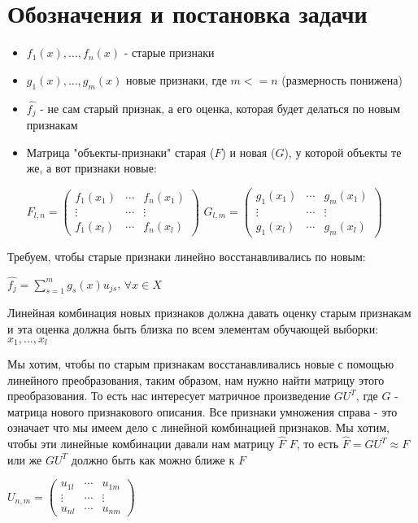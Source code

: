 \section{Обозначения и постановка задачи}

\begin{itemize}
    \item $f_{1}(x), \dotsc, f_{n}(x)$ - старые признаки
    \item $g_{1}(x), \dots ,g_{m}(x)$ новые признаки, где $m<=n$ (размерность понижена)
    \item $\hat{f_j}$ - не сам старый признак, а его оценка, которая будет делаться по новым признакам
    \item Матрица "объекты-признаки" старая ($F$) и новая ($G$), у которой объекты те же, а вот признаки новые: \par
        $F_{l,n} = 
         \begin{pmatrix}
          f_1(x_1) &  \cdots & f_n(x_1) \\
          \vdots   &  \cdots & \vdots   \\
          f_1(x_l) &  \cdots & f_n(x_l) 
         \end{pmatrix}$ 
        $G_{l,m} = 
         \begin{pmatrix}
          g_1(x_1) &  \cdots & g_m(x_1) \\
          \vdots   &  \cdots & \vdots   \\
          g_1(x_l) &  \cdots & g_m(x_l) 
         \end{pmatrix}$
\end{itemize}

Требуем, чтобы старые признаки линейно восстанавливались по новым:\par
$\hat{f_j} = \displaystyle\sum_{s=1}^{m} g_s(x)u_{js}$, $\forall x \in X$\par Линейная комбинация новых признаков должна давать оценку старым признакам и эта оценка должна быть близка по всем элементам обучающей выборки: $x_1, \dotsc, x_l$

Мы хотим, чтобы по старым признакам восстанавливались новые с помощью линейного преобразования, таким образом, нам нужно найти матрицу этого преобразования. То есть нас интересует матричное произведение $GU^T$, где $G$ - матрица нового признакового описания. Все признаки умножения справа - это означает что мы имеем дело с линейной комбинацией признаков. Мы хотим, чтобы эти линейные комбинации давали нам матрицу $\hat{F}$ \approx $F$, то есть $\hat{F} = GU^T \approx F$ или же $GU^T$ должно быть как можно ближе к $F$ \par
 $U_{n,m} = 
 \begin{pmatrix}
  u_{1l} &  \cdots & u_{1m} \\
  \vdots &  \cdots & \vdots \\
  u_{nl} &  \cdots & u_{nm} 
 \end{pmatrix}$\par


